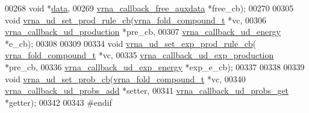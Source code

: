 \begin{DoxyCode}
00268                         \textcolor{keywordtype}{void}                        *\hyperlink{group__domains__up_a8802b1b0512999a9f35202031811ce17}{data},
00269                         \hyperlink{group__fold__compound_ga3ae51bfd5fc3236652d1de4e3274b49b}{vrna\_callback\_free\_auxdata}  *free\_cb);
00270 
00305 \textcolor{keywordtype}{void} \hyperlink{group__domains__up_ga745a99f0bc72898d54de16f6e538828a}{vrna\_ud\_set\_prod\_rule\_cb}(\hyperlink{group__fold__compound_structvrna__fc__s}{vrna\_fold\_compound\_t}        *vc,
00306                               \hyperlink{group__domains__up_ga5cb14c4f2149c3df9842a709d6d64140}{vrna\_callback\_ud\_production} *pre\_cb,
00307                               \hyperlink{group__domains__up_ga60a2244cf1415fd076cc0dba92c2a96d}{vrna\_callback\_ud\_energy}     *e\_cb);
00308 
00309 
00334 \textcolor{keywordtype}{void}  \hyperlink{group__domains__up_ga2fb1db2099da26c76247e1209ad4aa09}{vrna\_ud\_set\_exp\_prod\_rule\_cb}( 
      \hyperlink{group__fold__compound_structvrna__fc__s}{vrna\_fold\_compound\_t}            *vc,
00335                                     \hyperlink{group__domains__up_gae4c18aa60c657a4a856a4b41a9fbc0dc}{vrna\_callback\_ud\_exp\_production} *pre\_cb,
00336                                     \hyperlink{group__domains__up_ga79eb0224b0b6e0a86c9e8c4a1b0cad04}{vrna\_callback\_ud\_exp\_energy}     *exp\_e\_cb);
00337 
00338 
00339 \textcolor{keywordtype}{void}  \hyperlink{unstructured__domains_8h_a13ac877c9db89a1a5b5d9c0394148595}{vrna\_ud\_set\_prob\_cb}(\hyperlink{group__fold__compound_structvrna__fc__s}{vrna\_fold\_compound\_t}        *vc,
00340                           \hyperlink{group__domains__up_gacf121219e336f14d288a304564307f67}{vrna\_callback\_ud\_probs\_add}  *setter,
00341                           \hyperlink{group__domains__up_ga13eb77d5c404b08a8868e382a66ab8bb}{vrna\_callback\_ud\_probs\_get}  *getter);
00342 
00343 \textcolor{preprocessor}{#endif}
\end{DoxyCode}
